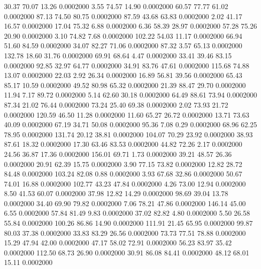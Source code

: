   30.37   70.07   13.26   0.0002000
   3.55   74.57   14.90   0.0002000
  60.57   77.77   61.02   0.0002000
  87.13   74.50   80.75   0.0002000
  87.59   43.68   63.83   0.0002000
   2.02   41.17   16.57   0.0002000
  17.04   75.32    6.88   0.0002000
   6.36   58.39   28.97   0.0002000
  57.28   75.26   20.90   0.0002000
   3.10   74.82    7.68   0.0002000
 102.22   54.03   11.17   0.0002000
  66.94   51.60   84.59   0.0002000
  34.07   82.27   71.06   0.0002000
  87.32    3.57   65.13   0.0002000
 132.78   18.60   31.76   0.0002000
  69.91   68.64    4.47   0.0002000
  33.41   39.46   83.15   0.0002000
  92.85   32.97   64.77   0.0002000
  34.91   83.76   47.61   0.0002000
 115.68   74.88   13.07   0.0002000
  22.03    2.92   26.34   0.0002000
  16.89   56.81   39.56   0.0002000
  65.43   85.17   10.59   0.0002000
  49.52   80.98   65.32   0.0002000
  21.39   88.47   29.70   0.0002000
  11.94    7.17   89.72   0.0002000
   5.14   62.60   30.18   0.0002000
  64.49   88.61   73.94   0.0002000
  87.34   21.02   76.44   0.0002000
  73.24   25.40   69.38   0.0002000
   2.02   73.93   21.72   0.0002000
 120.59   46.50   11.28   0.0002000
  11.60   65.27   26.72   0.0002000
  13.71   73.63   40.09   0.0002000
  67.19   34.71   50.08   0.0002000
  95.36    7.08    0.29   0.0002000
  68.96   62.25   78.95   0.0002000
 131.74   20.12   38.81   0.0002000
 104.07   70.29   23.92   0.0002000
  38.93   87.61   18.32   0.0002000
  17.30   63.46   83.53   0.0002000
  44.82   72.26    2.17   0.0002000
  24.56   36.87   17.36   0.0002000
 156.01   69.71    1.73   0.0002000
  39.21   48.57   26.36   0.0002000
  20.91   62.39   15.75   0.0002000
   3.90   77.15   73.82   0.0002000
  12.82   28.72   84.48   0.0002000
 103.24   82.08    0.88   0.0002000
   3.93   67.68   32.86   0.0002000
  50.67   74.01   16.88   0.0002000
 102.77   43.23   47.84   0.0002000
   4.26   73.00   12.94   0.0002000
   8.50   41.53   60.07   0.0002000
  37.98   12.82   14.29   0.0002000
  98.69   39.04   13.78   0.0002000
  34.40   69.90   79.82   0.0002000
   7.06   78.21   47.86   0.0002000
 146.14   45.00    6.55   0.0002000
  57.84   81.49    9.83   0.0002000
  37.02   82.82    4.80   0.0002000
   5.50   26.58   55.84   0.0002000
 100.26   86.86   14.90   0.0002000
 111.91   21.45   65.95   0.0002000
  99.87   80.03   37.38   0.0002000
  33.83   83.29   26.56   0.0002000
  73.73   77.51   78.88   0.0002000
  15.29   47.94   42.00   0.0002000
  47.17   58.02   72.91   0.0002000
  56.23   83.97   35.42   0.0002000
 112.50   68.73   26.90   0.0002000
  30.91   86.08   84.41   0.0002000
  48.12   68.01   15.11   0.0002000
